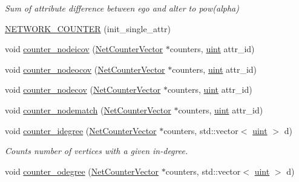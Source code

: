 \begin{Indent}
\begin{DoxyCompactItemize}
\begin{DoxyCompactList}\small\item\em Sum of attribute difference between ego and alter to pow(alpha) \end{DoxyCompactList}\item 
\hyperlink{namespacebarry_1_1counters_1_1network_a7649cd035af193258a69058aea425941}{N\+E\+T\+W\+O\+R\+K\+\_\+\+C\+O\+U\+N\+T\+ER} (init\+\_\+single\+\_\+attr)
\item 
void \hyperlink{namespacebarry_1_1counters_1_1network_aef48e4ae85d30c2a949006faee2b5bae}{counter\+\_\+nodeicov} (\hyperlink{namespacebarry_1_1counters_1_1network_a3b3c590303d47840d1967372ae495d95}{Net\+Counter\+Vector} $\ast$counters, \hyperlink{namespacebarry_a11dfc53ddb4672278319aa04f1e09a6c}{uint} attr\+\_\+id)
\item 
void \hyperlink{namespacebarry_1_1counters_1_1network_a2804cd2dba633fdccc7a1ca6a15bdf47}{counter\+\_\+nodeocov} (\hyperlink{namespacebarry_1_1counters_1_1network_a3b3c590303d47840d1967372ae495d95}{Net\+Counter\+Vector} $\ast$counters, \hyperlink{namespacebarry_a11dfc53ddb4672278319aa04f1e09a6c}{uint} attr\+\_\+id)
\item 
void \hyperlink{namespacebarry_1_1counters_1_1network_a7087c6419195bc768c1e8c7730757d2e}{counter\+\_\+nodecov} (\hyperlink{namespacebarry_1_1counters_1_1network_a3b3c590303d47840d1967372ae495d95}{Net\+Counter\+Vector} $\ast$counters, \hyperlink{namespacebarry_a11dfc53ddb4672278319aa04f1e09a6c}{uint} attr\+\_\+id)
\item 
void \hyperlink{namespacebarry_1_1counters_1_1network_ab0a33b2990950574552ab909e6847f96}{counter\+\_\+nodematch} (\hyperlink{namespacebarry_1_1counters_1_1network_a3b3c590303d47840d1967372ae495d95}{Net\+Counter\+Vector} $\ast$counters, \hyperlink{namespacebarry_a11dfc53ddb4672278319aa04f1e09a6c}{uint} attr\+\_\+id)
\item 
void \hyperlink{namespacebarry_1_1counters_1_1network_ab87617883960a1fc818048036fb13b83}{counter\+\_\+idegree} (\hyperlink{namespacebarry_1_1counters_1_1network_a3b3c590303d47840d1967372ae495d95}{Net\+Counter\+Vector} $\ast$counters, std\+::vector$<$ \hyperlink{namespacebarry_a11dfc53ddb4672278319aa04f1e09a6c}{uint} $>$ d)
\begin{DoxyCompactList}\small\item\em Counts number of vertices with a given in-\/degree. \end{DoxyCompactList}\item 
void \hyperlink{namespacebarry_1_1counters_1_1network_af679a51acdd35805c7c40748af65c0f4}{counter\+\_\+odegree} (\hyperlink{namespacebarry_1_1counters_1_1network_a3b3c590303d47840d1967372ae495d95}{Net\+Counter\+Vector} $\ast$counters, std\+::vector$<$ \hyperlink{namespacebarry_a11dfc53ddb4672278319aa04f1e09a6c}{uint} $>$ d)

\end{DoxyCompactItemize}
\end{Indent}
